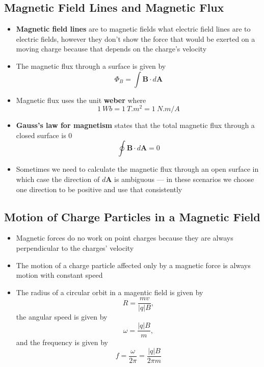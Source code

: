 \documentclass{article}
\begin{document}
\subsection{Magnetic Field Lines and Magnetic Flux}

\begin{itemize}
  \item \textbf{Magnetic field lines} are to magnetic fields what electric field lines are to electric fields, however they don't show the force that would be exerted on a moving charge because that depends on the charge's velocity

  \item The magnetic flux through a surface is given by \[\Phi_B = \int \mathbf{B} \cdot d \mathbf{A}\]

  \item Magnetic flux uses the unit \textbf{weber} where \[\qty{1}{Wb} = \qty{1}{T.m^2} = \qty{1}{N.m/A}\]

  \item \textbf{Gauss's law for magnetism} states that the total magnetic flux through a closed surface is 0 \[\oint \mathbf{B} \cdot d \mathbf{A} = 0\]

  \item Sometimes we need to calculate the magnetic flux through an open surface in which case the direction of $d \mathbf{A}$ is ambiguous — in these scenarios we choose one direction to be positive and use that consistently
\end{itemize}

\subsection{Motion of Charge Particles in a Magnetic Field}

\begin{itemize}
  \item Magnetic forces do no work on point charges because they are always perpendicular to the charges' velocity

  \item The motion of a charge particle affected only by a magnetic force is always motion with constant speed

  \item The radius of a circular orbit in a magentic field is given by \[R = \frac{m v}{|q| B},\] the angular speed is given by \[\omega = \frac{|q| B}{m},\] and the frequency is given by \[f = \frac{\omega}{2 \pi} = \frac{|q| B}{2 \pi m}\]
\end{itemize}
\end{document}
